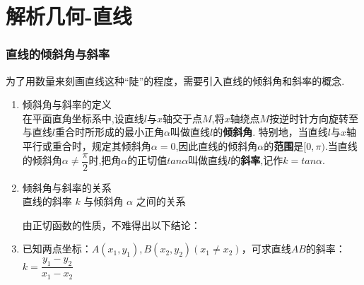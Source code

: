 \chapter*{解析几何-直线}
\subsection*{直线的倾斜角与斜率}
为了用数量来刻画直线这种“陡”的程度，需要引入直线的倾斜角和斜率的概念.
\begin{enumerate}
    \item 倾斜角与斜率的定义\\
    在平面直角坐标系中,设直线$l$与$x$轴交于点$M$,将$x$轴绕点$M$按逆时针方向旋转至与直线$l$重合时所形成的最小正角$\alpha$叫做直线$l$的\textbf{倾斜角}. 特别地，当直线$l$与$x$轴平行或重合时，规定其倾斜角$\alpha = 0$,因此直线的倾斜角$\alpha$的\textbf{范围}是$[0, \pi)$.当直线的倾斜角$\alpha \neq \dfrac{\pi}{2}$时,把角$\alpha$的正切值$tan \alpha$叫做直线$l$的\textbf{斜率},记作$k = tan\alpha$.
    \item 倾斜角与斜率的关系\\
    直线的斜率 $k$ 与倾斜角 $\alpha$ 之间的关系
    
    \begin{center}
    \end{center}
    由正切函数的性质，不难得出以下结论：
    \item 已知两点坐标：$A(x_1, y_1), B(x_2, y_2) (x_1 \neq x_2)$，可求直线$AB$的斜率：$k = \dfrac{y_1 - y_2}{x_1 - x_2}$
\end{enumerate}

